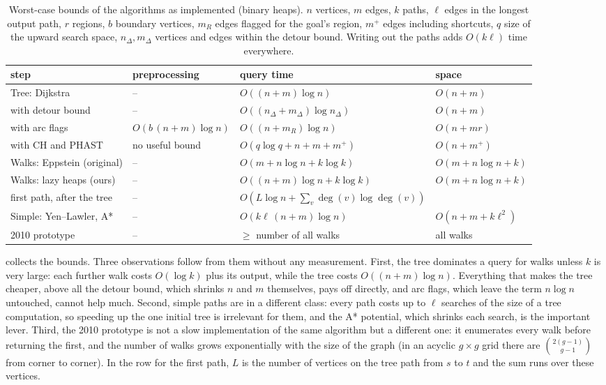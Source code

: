 \documentclass[11pt,a4paper]{article}
\begin{document}
\begin{table}[t]
\centering
\caption{Worst-case bounds of the algorithms as implemented (binary heaps). $n$ vertices, $m$ edges, $k$ paths,
$\ell$ edges in the longest output path, $r$ regions, $b$ boundary vertices, $m_R$ edges flagged for the goal's
region, $m^+$ edges including shortcuts, $q$ size of the upward search space, $n_\Delta,m_\Delta$ vertices and
edges within the detour bound. Writing out the paths adds $O(k\ell)$ time everywhere.}
\label{tab:complexity}
\footnotesize
\begin{tabular}{@{}llll@{}}
\toprule
step & preprocessing & query time & space \\
\midrule
Tree: Dijkstra & -- & $O((n+m)\log n)$ & $O(n+m)$ \\
\quad with detour bound & -- & $O((n_\Delta+m_\Delta)\log n_\Delta)$ & $O(n+m)$ \\
\quad with arc flags & $O(b\,(n+m)\log n)$ & $O((n+m_R)\log n)$ & $O(n+mr)$ \\
\quad with CH and PHAST & no useful bound & $O(q\log q+n+m+m^+)$ & $O(n+m^+)$ \\
\midrule
Walks: Eppstein (original) & -- & $O(m+n\log n+k\log k)$ & $O(m+n\log n+k)$ \\
Walks: lazy heaps (ours) & -- & $O((n+m)\log n+k\log k)$ & $O(m+n\log n+k)$ \\
\quad first path, after the tree & -- & $O(L\log n+\sum_{v}\deg(v)\log\deg(v))$ & \\
Simple: Yen--Lawler, A* & -- & $O(k\ell\,(n+m)\log n)$ & $O(n+m+k\ell^2)$ \\
2010 prototype & -- & $\ge$ number of all walks & all walks \\
\bottomrule
\end{tabular}
\end{table}

 collects the bounds. Three observations follow from them without any measurement. First, the
tree dominates a query for walks unless $k$ is very large: each further walk costs $O(\log k)$ plus its output,
while the tree costs $O((n+m)\log n)$. Everything that makes the tree cheaper, above all the detour bound, which
shrinks $n$ and $m$ themselves, pays off directly, and arc flags, which leave the term $n\log n$ untouched, cannot
help much. Second, simple paths are in a different class: every path costs up to $\ell$ searches of the size of a
tree computation, so speeding up the one initial tree is irrelevant for them, and the A* potential, which shrinks
each search, is the important lever. Third, the 2010 prototype is not a slow implementation of the same algorithm
but a different one: it enumerates every walk before returning the first, and the number of walks grows
exponentially with the size of the graph (in an acyclic $g\times g$ grid there are $\binom{2(g-1)}{g-1}$ from corner
to corner). In the row for the first path, $L$ is the number of vertices on the tree path from $s$ to $t$ and the
sum runs over these vertices.
\end{document}
